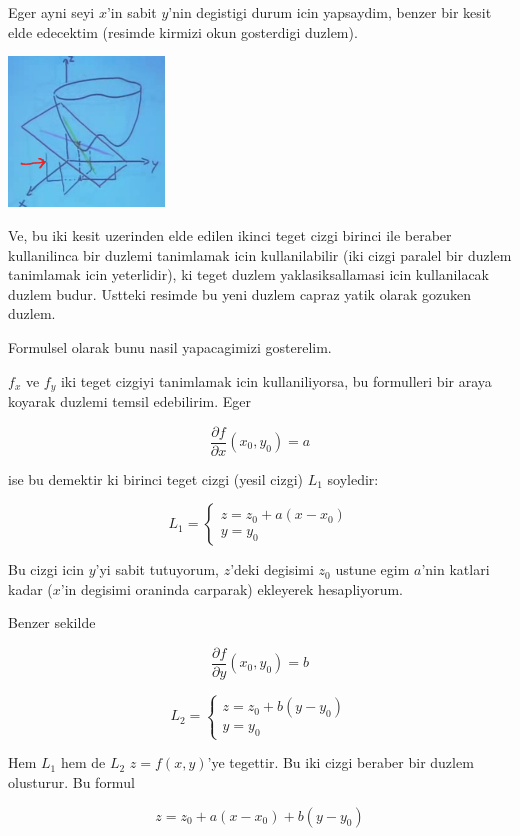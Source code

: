 \documentclass[12pt,fleqn]{article}
\begin{document}
Eger ayni seyi $x$'in sabit $y$'nin degistigi durum icin yapsaydim,
benzer bir kesit elde edecektim (resimde kirmizi okun gosterdigi duzlem). 

\includegraphics[height=4cm]{9_2.png}

Ve, bu iki kesit uzerinden elde edilen ikinci teget cizgi birinci ile beraber
kullanilinca bir duzlemi tanimlamak icin kullanilabilir (iki cizgi paralel
bir duzlem tanimlamak icin yeterlidir), ki teget duzlem yaklasiksallamasi
icin kullanilacak duzlem budur. Ustteki resimde bu yeni duzlem capraz yatik
olarak gozuken duzlem. 

Formulsel olarak bunu nasil yapacagimizi gosterelim.

$f_x$ ve $f_y$ iki teget cizgiyi tanimlamak icin kullaniliyorsa, bu
formulleri bir araya koyarak duzlemi temsil edebilirim. Eger

\[ \frac{\partial f}{\partial x}(x_0,y_0) = a \]

ise bu demektir ki birinci teget cizgi (yesil cizgi) $L_1$ soyledir:

\[ 
L_1 = 
\left\{ \begin{array}{l}
z = z_0 + a(x - x_0) \\
y = y_0
\end{array} \right.
 \]

Bu cizgi icin $y$'yi sabit tutuyorum, $z$'deki degisimi $z_0$ ustune egim
$a$'nin katlari kadar ($x$'in degisimi oraninda carparak) ekleyerek
hesapliyorum. 

Benzer sekilde

\[ \frac{\partial f}{\partial y}(x_0,y_0) = b \]

\[ 
L_2 = 
\left\{ \begin{array}{l}
z = z_0 + b(y - y_0) \\
y = y_0
\end{array} \right.
 \]

Hem $L_1$ hem de $L_2$ $z = f(x,y)$'ye tegettir. Bu iki cizgi beraber bir
duzlem olusturur. Bu formul

\begin{equation}\label{eq2}
z = z_0 + a(x-x_0) + b(y-y_0) 
\end{equation}
\end{document}

